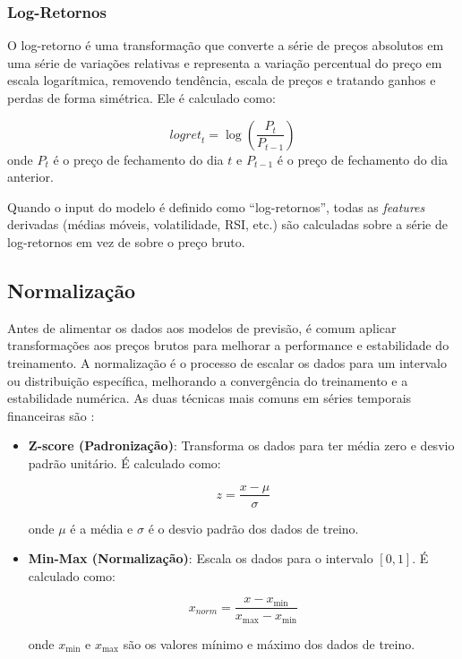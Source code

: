 \subsubsection{Log-Retornos}

O log-retorno é uma transformação que converte a série de preços absolutos em uma série de variações relativas e representa a variação percentual do preço em escala logarítmica, removendo tendência, escala de preços e tratando ganhos e perdas de forma simétrica. Ele é calculado como:

\begin{equation}
\textit{logret}_t = \log\left(\frac{P_t}{P_{t-1}}\right)
\end{equation}
onde $P_t$ é o preço de fechamento do dia $t$ e $P_{t-1}$ é o preço de fechamento do dia anterior.


Quando o input do modelo é definido como ``log-retornos'', todas as \textit{features} derivadas (médias móveis, volatilidade, RSI, etc.) são calculadas sobre a série de log-retornos em vez de sobre o preço bruto.

\subsection{Normalização}

Antes de alimentar os dados aos modelos de previsão, é comum aplicar transformações aos preços brutos para melhorar a performance e estabilidade do treinamento. A normalização é o processo de escalar os dados para um intervalo ou distribuição específica, melhorando a convergência do treinamento e a estabilidade numérica. As duas técnicas mais comuns em séries temporais financeiras são \cite{site18}:

\begin{itemize}
    \item \textbf{Z-score (Padronização)}: Transforma os dados para ter média zero e desvio padrão unitário. É calculado como:
    
    \begin{equation}
    z = \frac{x - \mu}{\sigma}
    \end{equation}
    
    onde $\mu$ é a média e $\sigma$ é o desvio padrão dos dados de treino. 
    
    \item \textbf{Min-Max (Normalização)}: Escala os dados para o intervalo $[0, 1]$. É calculado como:
    
    \begin{equation}
    x_{\textit{norm}} = \frac{x - x_{\min}}{x_{\max} - x_{\min}}
    \end{equation}
    
    onde $x_{\min}$ e $x_{\max}$ são os valores mínimo e máximo dos dados de treino.
\end{itemize}

